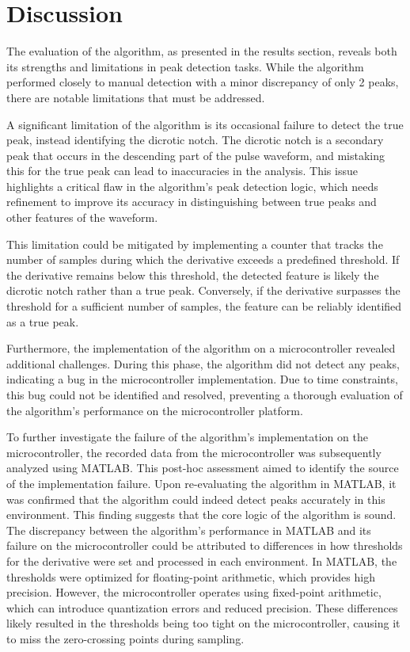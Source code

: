 
\section{Discussion}
The evaluation of the algorithm, as presented in the results section, reveals both its strengths and limitations in peak detection tasks. While the algorithm performed closely to manual detection with a minor discrepancy of only 2 peaks, there are notable limitations that must be addressed.

A significant limitation of the algorithm is its occasional failure to detect the true peak, instead identifying the dicrotic notch. The dicrotic notch is a secondary peak that occurs in the descending part of the pulse waveform, and mistaking this for the true peak can lead to inaccuracies in the analysis. This issue highlights a critical flaw in the algorithm's peak detection logic, which needs refinement to improve its accuracy in distinguishing between true peaks and other features of the waveform. 

This limitation could be mitigated by implementing a counter that tracks the number of samples during which the derivative exceeds a predefined threshold. If the derivative remains below this threshold, the detected feature is likely the dicrotic notch rather than a true peak. Conversely, if the derivative surpasses the threshold for a sufficient number of samples, the feature can be reliably identified as a true peak.

Furthermore, the implementation of the algorithm on a microcontroller revealed additional challenges. During this phase, the algorithm did not detect any peaks, indicating a bug in the microcontroller implementation. Due to time constraints, this bug could not be identified and resolved, preventing a thorough evaluation of the algorithm's performance on the microcontroller platform.

To further investigate the failure of the algorithm's implementation on the microcontroller, the recorded data from the microcontroller was subsequently analyzed using MATLAB. This post-hoc assessment aimed to identify the source of the implementation failure. Upon re-evaluating the algorithm in MATLAB, it was confirmed that the algorithm could indeed detect peaks accurately in this environment. This finding suggests that the core logic of the algorithm is sound. The discrepancy between the algorithm's performance in MATLAB and its failure on the microcontroller could be attributed to differences in how thresholds for the derivative were set and processed in each environment. In MATLAB, the thresholds were optimized for floating-point arithmetic, which provides high precision. However, the microcontroller operates using fixed-point arithmetic, which can introduce quantization errors and reduced precision. These differences likely resulted in the thresholds being too tight on the microcontroller, causing it to miss the zero-crossing points during sampling.

